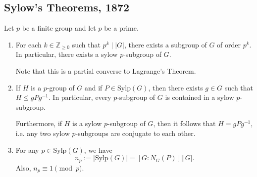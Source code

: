 \documentclass{article}
\begin{document}
\subsection{Sylow's Theorems, 1872}
\begin{idea}
    Let $p$ be a finite group and let $p$ be a prime.
    \begin{enumerate}
        \item For each $k\in \mathbb{Z}_{\ge 0}$ such that $p^k \mid |G|$, there exists a subgroup of $G$ of order $p^k$. In particular, there exists a sylow $p$-subgroup of $G$.
              \vspace{2mm}

              Note that this is a partial converse to Lagrange's Theorem.
        \item If $H$ is a $p$-group of $G$ and if $P\in\text{Sylp}(G)$, then there exists $g\in G$ such that $H \le gPg^{-1}$. In particular, every $p$-subgroup of $G$ is contained in a sylow $p$-subgroup.

              Furthermore, if $H$ is a sylow $p$-subgroup of $G$, then it follows that $H=gPg^{-1}$, i.e. any two sylow $p$-subgroups are conjugate to each other.
        \item For any $p\in\text{Sylp}(G)$, we have
              \begin{equation*}
                  n_p := |\text{Sylp}(G)| = [G:N_G(P)] \bigg| |G|.
              \end{equation*}
              Also, $n_p \equiv 1 \pmod{p}.$
    \end{enumerate}
\end{idea}
\end{document}
